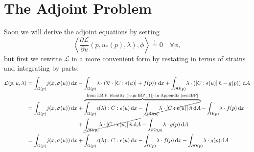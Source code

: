 \documentclass[10pt]{article}
\renewcommand{\div}{\nabla \cdot}
\providecommand{\shape}{\Omega(p)}
\providecommand{\boundary}{\partial \shape}
\providecommand{\vint}[1]{\int_{\shape} \! #1 \, \mathrm{d}x}
\providecommand{\sint}[1]{\int_{\boundary} \! #1 \, \mathrm{d}A}
\providecommand{\pder}[2]{\frac{\partial #1}{\partial #2}}
\begin{document}
\section{The Adjoint Problem}
Soon we will derive the adjoint equations by setting
$$
\left<\pder{\mathcal{L}}{u}(p, u_*(p), \lambda), \phi \right> \overset{!}{=} 0 \quad \forall \phi,
$$
but first we rewrite $\mathcal{L}$ in a more convenient form by restating
in terms of strains and integrating by parts:
\begin{align}
    \mathcal{L}(p, u, \lambda) = \vint{j(x, \sigma(u))} &- \vint{\lambda \cdot \left(\div \left[ C:\epsilon(u)\right] + f(p)\right)}
    + \sint{\lambda \cdot \left(\left[C : \epsilon(u)\right] \hat{n} - g(p)\right)} \notag \\
    = \vint{j(x, \sigma(u))} &+ \overbrace{\vint{\epsilon(\lambda) : C : \epsilon(u)}
- \cancel{\sint{\lambda \cdot \left[C:\epsilon(u)\right]\hat{n}}}}^{\text{from I.B.P. identity (\ref{eqn:IBP_1}) in Appendix \ref{sec:IBP}}}
- \vint{\lambda \cdot f(p)} \notag \\
        &+ \cancel{\sint{\lambda \cdot \left[C:\epsilon(u)\right]\hat{n}}}
         - \sint{\lambda \cdot g(p)} \notag \\
    = \vint{j(x, \sigma(u))} &+ \vint{\epsilon(\lambda) : C : \epsilon(u)} - \vint{\lambda \cdot f(p)} - \sint{\lambda \cdot g(p)}
    \label{eqn:lagrangian}
\end{align}
\end{document}
